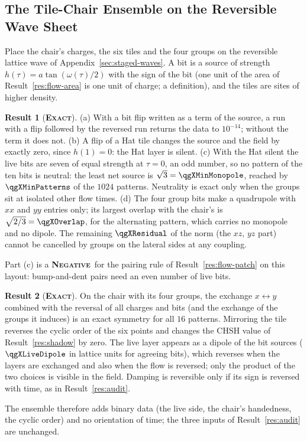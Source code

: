 \documentclass[11pt]{article}
\newcommand{\exact}{\textbf{\textsc{Exact}}}
\newcommand{\negres}{\textbf{\textsc{Negative}}}
\theoremstyle{definition}
\newtheorem{result}{Result}
\begin{document}
\subsection{The Tile-Chair Ensemble on the Reversible Wave Sheet}
\label{sec:third-ensemble}
Place the chair's charges, the six tiles and the four groups on the reversible lattice wave of Appendix~\ref{sec:staged-waves}. A bit is a source of strength $h(\tau)=a\tan(\omega(\tau)/2)$ with the sign of the bit (one unit of the area of Result~\ref{res:flow-area} is one unit of charge; a definition), and the tiles are sites of higher density.
\begin{result}[\exact]\label{res:ensemble}
(a) With a bit flip written as a term of the source, a run with a flip followed by the reversed run returns the data to $10^{-14}$; without the term it does not. (b) A flip of a Hat tile changes the source and the field by exactly zero, since $h(1)=0$: the Hat layer is silent. (c) With the Hat silent the live bits are seven of equal strength at $\tau=0$, an odd number, so no pattern of the ten bits is neutral: the least net source is $\sqrt3=\qgXMinMonopole$, reached by $\qgXMinPatterns$ of the $1024$ patterns. Neutrality is exact only when the groups sit at isolated other flow times. (d) The four group bits make a quadrupole with $xx$ and $yy$ entries only; its largest overlap with the chair's is $\sqrt{2/3}=\qgXOverlap$, for the alternating pattern, which carries no monopole and no dipole. The remaining $\qgXResidual$ of the norm (the $xz$, $yz$ part) cannot be cancelled by groups on the lateral sides at any coupling.
\end{result}
Part (c) is a \negres\ for the pairing rule of Result~\ref{res:flow-patch} on this layout: bump-and-dent pairs need an even number of live bits.

\begin{result}[\exact]\label{res:third-arrow}
On the chair with its four groups, the exchange $x\leftrightarrow y$ combined with the reversal of all charges and bits (and the exchange of the groups it induces) is an exact symmetry for all $16$ patterns. Mirroring the tile reverses the cyclic order of the six points and changes the CHSH value of Result~\ref{res:shadow} by zero. The live layer appears as a dipole of the bit sources ($\qgXLiveDipole$ in lattice units for agreeing bits), which reverses when the layers are exchanged and also when the flow is reversed; only the product of the two choices is visible in the field. Damping is reversible only if its sign is reversed with time, as in Result~\ref{res:audit}.
\end{result}
The ensemble therefore adds binary data (the live side, the chair's handedness, the cyclic order) and no orientation of time; the three inputs of Result~\ref{res:audit} are unchanged.
\end{document}
